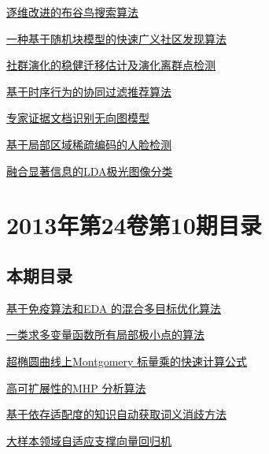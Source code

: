 \documentclass[a4paper]{article}
\begin{document}
\href{http://www.jos.org.cn/ch/reader/download_pdf.aspx?file_no=4476&year_id=2013&quarter_id=11&falg=1}{逐维改进的布谷鸟搜索算法}

\href{http://www.jos.org.cn/ch/reader/download_pdf.aspx?file_no=4474&year_id=2013&quarter_id=11&falg=1}{一种基于随机块模型的快速广义社区发现算法}

\href{http://www.jos.org.cn/ch/reader/download_pdf.aspx?file_no=4477&year_id=2013&quarter_id=11&falg=1}{社群演化的稳健迁移估计及演化离群点检测}

\href{http://www.jos.org.cn/ch/reader/download_pdf.aspx?file_no=4478&year_id=2013&quarter_id=11&falg=1}{基于时序行为的协同过滤推荐算法}

\href{http://www.jos.org.cn/ch/reader/download_pdf.aspx?file_no=4480&year_id=2013&quarter_id=11&falg=1}{专家证据文档识别无向图模型}

\href{http://www.jos.org.cn/ch/reader/download_pdf.aspx?file_no=4484&year_id=2013&quarter_id=11&falg=1}{基于局部区域稀疏编码的人脸检测}

\href{http://www.jos.org.cn/ch/reader/download_pdf.aspx?file_no=4481&year_id=2013&quarter_id=11&falg=1}{融合显著信息的LDA极光图像分类}


\section{\textbf{2013年第24卷第10期目录}}
\subsection{本期目录}
\href{http://www.jos.org.cn/ch/reader/download_pdf.aspx?file_no=4341&year_id=2013&quarter_id=10&falg=1}{基于免疫算法和EDA 的混合多目标优化算法}

\href{http://www.jos.org.cn/ch/reader/download_pdf.aspx?file_no=4337&year_id=2013&quarter_id=10&falg=1}{一类求多变量函数所有局部极小点的算法}

\href{http://www.jos.org.cn/ch/reader/download_pdf.aspx?file_no=4370&year_id=2013&quarter_id=10&falg=1}{超椭圆曲线上Montgomery 标量乘的快速计算公式}

\href{http://www.jos.org.cn/ch/reader/download_pdf.aspx?file_no=4372&year_id=2013&quarter_id=10&falg=1}{高可扩展性的MHP 分析算法}

\href{http://www.jos.org.cn/ch/reader/download_pdf.aspx?file_no=4373&year_id=2013&quarter_id=10&falg=1}{基于依存适配度的知识自动获取词义消歧方法}

\href{http://www.jos.org.cn/ch/reader/download_pdf.aspx?file_no=4375&year_id=2013&quarter_id=10&falg=1}{大样本领域自适应支撑向量回归机}
\end{document}
